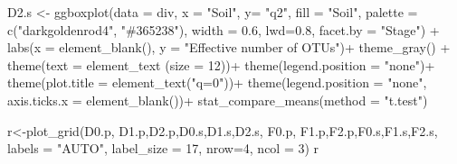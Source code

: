 \documentclass[]{interact}
\theoremstyle{plain}%
\theoremstyle{definition}
\theoremstyle{remark}
\newenvironment{Shaded}{\begin{snugshade}}{\end{snugshade}}
\newcommand{\AttributeTok}[1]{\textcolor[rgb]{0.77,0.63,0.00}{#1}}
\newcommand{\DecValTok}[1]{\textcolor[rgb]{0.00,0.00,0.81}{#1}}
\newcommand{\FloatTok}[1]{\textcolor[rgb]{0.00,0.00,0.81}{#1}}
\newcommand{\FunctionTok}[1]{\textcolor[rgb]{0.00,0.00,0.00}{#1}}
\newcommand{\NormalTok}[1]{#1}
\newcommand{\OtherTok}[1]{\textcolor[rgb]{0.56,0.35,0.01}{#1}}
\newcommand{\SpecialCharTok}[1]{\textcolor[rgb]{0.00,0.00,0.00}{#1}}
\newcommand{\StringTok}[1]{\textcolor[rgb]{0.31,0.60,0.02}{#1}}
\begin{document}
\begin{Shaded}
\begin{Highlighting}[]
\NormalTok{D2.s }\OtherTok{\textless{}{-}} \FunctionTok{ggboxplot}\NormalTok{(}\AttributeTok{data =}\NormalTok{ div, }\AttributeTok{x =} \StringTok{"Soil"}\NormalTok{, }\AttributeTok{y=} \StringTok{"q2"}\NormalTok{,}
                  \AttributeTok{fill =} \StringTok{"Soil"}\NormalTok{, }\AttributeTok{palette =} \FunctionTok{c}\NormalTok{(}\StringTok{"darkgoldenrod4"}\NormalTok{, }\StringTok{"\#365238"}\NormalTok{), }
                  \AttributeTok{width =} \FloatTok{0.6}\NormalTok{, }\AttributeTok{lwd=}\FloatTok{0.8}\NormalTok{, }\AttributeTok{facet.by =} \StringTok{"Stage"}\NormalTok{)  }\SpecialCharTok{+}
  \FunctionTok{labs}\NormalTok{(}\AttributeTok{x =} \FunctionTok{element\_blank}\NormalTok{(), }\AttributeTok{y =} \StringTok{"Effective number of OTUs"}\NormalTok{)}\SpecialCharTok{+}
  \FunctionTok{theme\_gray}\NormalTok{() }\SpecialCharTok{+}
  \FunctionTok{theme}\NormalTok{(}\AttributeTok{text =} \FunctionTok{element\_text}\NormalTok{ (}\AttributeTok{size =} \DecValTok{12}\NormalTok{))}\SpecialCharTok{+}
  \FunctionTok{theme}\NormalTok{(}\AttributeTok{legend.position =} \StringTok{"none"}\NormalTok{)}\SpecialCharTok{+}
  \FunctionTok{theme}\NormalTok{(}\AttributeTok{plot.title =} \FunctionTok{element\_text}\NormalTok{(}\StringTok{"q=0"}\NormalTok{))}\SpecialCharTok{+}
  \FunctionTok{theme}\NormalTok{(}\AttributeTok{legend.position =} \StringTok{"none"}\NormalTok{,}
        \AttributeTok{axis.ticks.x =} \FunctionTok{element\_blank}\NormalTok{())}\SpecialCharTok{+}
  \FunctionTok{stat\_compare\_means}\NormalTok{(}\AttributeTok{method =} \StringTok{"t.test"}\NormalTok{)}


\NormalTok{r}\OtherTok{\textless{}{-}}\FunctionTok{plot\_grid}\NormalTok{(D0.p, D1.p,D2.p,D0.s,D1.s,D2.s, F0.p, F1.p,F2.p,F0.s,F1.s,F2.s, }
             \AttributeTok{labels =} \StringTok{"AUTO"}\NormalTok{, }
             \AttributeTok{label\_size =} \DecValTok{17}\NormalTok{, }\AttributeTok{nrow=}\DecValTok{4}\NormalTok{, }\AttributeTok{ncol =} \DecValTok{3}\NormalTok{)}
\NormalTok{r}
\end{Highlighting}
\end{Shaded}
\end{document}
